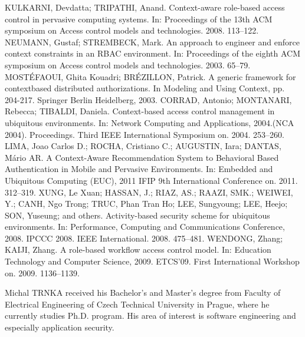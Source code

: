 \documentclass{poster15}
\begin{document}
\begin{thebibliography}{9}
KULKARNI, Devdatta; TRIPATHI, Anand. Context-aware role-based access control in pervasive computing systems. In: Proceedings of the 13th ACM symposium on Access control models and technologies. 2008. 113–122.
NEUMANN, Gustaf; STREMBECK, Mark. An approach to engineer and enforce context constraints in an RBAC environment. In: Proceedings of the eighth ACM symposium on Access control models and technologies. 2003. 65–79.
MOST\'EFAOUI, Ghita Kouadri; BR\'EZILLON, Patrick. A generic framework for contextbased distributed authorizations. In Modeling and Using Context, pp. 204-217. Springer Berlin Heidelberg, 2003.
CORRAD, Antonio; MONTANARI, Rebecca; TIBALDI, Daniela. Context-based access control management in ubiquitous environments. In: Network Computing and Applications, 2004.(NCA 2004). Proceedings. Third IEEE International Symposium on. 2004. 253–260.
LIMA, Joao Carlos D.; ROCHA, Cristiano C.; AUGUSTIN, Iara; DANTAS, Mário AR. A Context-Aware Recommendation System to Behavioral Based Authentication in Mobile and Pervasive Environments. In: Embedded and Ubiquitous Computing (EUC), 2011 IFIP 9th International Conference on. 2011. 312–319.
XUNG, Le Xuan; HASSAN, J.; RIAZ, AS.; RAAZI, SMK.; WEIWEI, Y.; CANH, Ngo Trong; TRUC, Phan
Tran Ho; LEE, Sungyoung; LEE, Heejo; SON, Yuseung; and others. Activity-based security scheme for ubiquitous environments. In: Performance, Computing and Communications Conference, 2008. IPCCC 2008. IEEE International. 2008. 475–481.
WENDONG, Zhang; KAIJI, Zhang. A role-based workflow access control model. In: Education Technology and Computer Science, 2009. ETCS’09. First International Workshop on. 2009. 1136–1139.
\end{thebibliography}

\begin{authorcv}{Michal TRNKA}
received his Bachelor's and Master's degree from Faculty of Electrical Engineering of Czech Technical University in Prague, where he currently studies Ph.D. program. His area of interest is software engineering and especially application security.
\end{authorcv}
\end{document}
